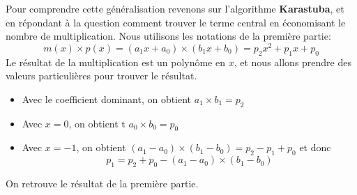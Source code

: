 \documentclass[11pt,french]{article}
\theoremstyle{plain}
\newcommand{\x}{\times}
\begin{document}
Pour comprendre cette généralisation revenons sur l'algorithme \textbf{Karastuba}, et en répondant à la question comment trouver le terme central en économisant le nombre de multiplication. Nous utilisons les notations de la première partie:
\begin{equation}
m(x)\x p(x) = \left( a_1 x + a_0 \right) \x \left( b_1 x + b_0 \right) = p_2 x^2 + p_1 x+ p_0
\end{equation}
Le résultat de la multiplication est un polynôme en $x$, et nous allons prendre des valeurs particulières pour trouver le résultat.
\begin{itemize}
    \item Avec le coefficient dominant, on obtient $a_1\times b_1 = p_2$
    \item Avec $x=0$, on obtient t $a_0 \times b_0 = p_0$
    \item Avec $x=-1$, on obtient $\left( a_1 -  a_0 \right) \x \left( b_1 -  b_0 \right) = p_2-p_1+p_0$ et donc \[p_1=p_2+p_0-\left( a_1 -  a_0 \right) \x \left( b_1 -  b_0 \right)\]
\end{itemize}
On retrouve le résultat de la première partie.
\end{document}
